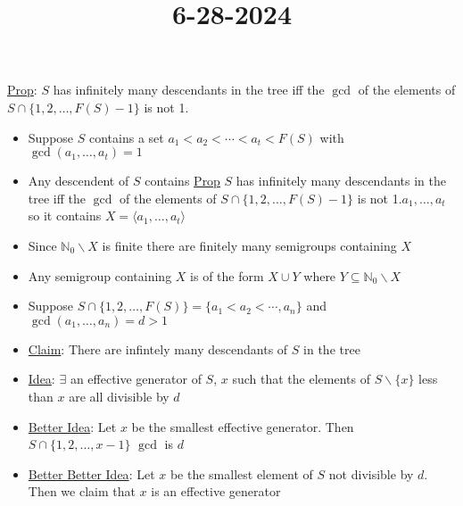 \documentclass{article}
\title{6-28-2024}
\date{}
\newcommand{\N}{{\mathbb N}}
\begin{document}
\maketitle
\underline{Prop}: $S$ has infinitely many descendants in the tree iff the $\gcd$ of the elements of $S\cap \{1,2,\dots,F(S)-1\}$ is not 1.
\begin{itemize}
    \item Suppose $S$ contains a set $a_1<a_2<\cdots<a_t<F(S)$ with $\gcd(a_1,\dots,a_t)=1$
    \item Any descendent of $S$ contains \underline{Prop} $S$ has infinitely many descendants in the tree iff the $\gcd$ of the elements of $S\cap \{1,2,\dots,F(S)-1\}$ is not 1.$a_1,\dots,a_t$ so it contains $X=\langle a_1,\dots,a_t\rangle$
    \item Since $\N_0\backslash X$ is finite there are finitely many semigroups containing $X$
    \item Any semigroup containing $X$ is of the form $X\cup Y$ where $Y\subseteq \N_0\backslash X$
    \item Suppose $S\cap\{1,2,\dots,F(S)\}=\{a_1<a_2<\cdots,a_n\}$ and $\gcd(a_1,\dots,a_n)=d>1$
    \item \underline{Claim}: There are infintely many descendants of $S$ in the tree
    \item \underline{Idea}: $\exists$ an effective generator of $S$, $x$ such that the elements of $S\backslash\{x\}$ less than $x$ are all divisible by $d$
    \item\underline{Better Idea}: Let $x$ be the smallest effective generator. Then $S\cap\{1,2,\dots,x-1\}$ $\gcd$ is $d$
    \item\underline{Better Better Idea}: Let $x$ be the smallest element of $S$ not divisible by $d$. Then we claim that $x$ is an effective generator
\end{itemize}
\end{document}
